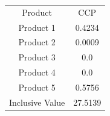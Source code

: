 \begin{tabular}{cc}
Product & CCP \\
Product 1 & 0.4234 \\
Product 2 & 0.0009 \\
Product 3 & 0.0 \\
Product 4 & 0.0 \\
Product 5 & 0.5756 \\
Inclusive Value & 27.5139 \\
\end{tabular}